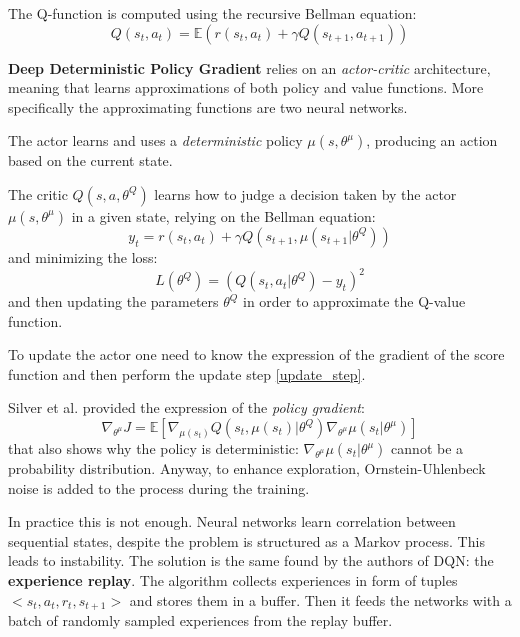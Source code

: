 \documentclass[10pt,a4paper]{scrartcl}
\begin{document}
The Q-function is computed using the recursive Bellman equation:
\begin{equation}
	Q(s_t,a_t) = \mathbb{E}(r(s_t, a_t) + \gamma Q(s_{t+1}, a_{t+1}))
\end{equation}

\textbf{Deep Deterministic Policy Gradient} relies on an \textit{actor-critic} architecture, meaning that learns approximations of both policy and value functions. More specifically the approximating functions are two neural networks.

The actor learns and uses a \textit{deterministic} policy $ \mu(s,\theta^\mu) $, producing an action based on the current state.

The critic $ Q(s,a,\theta^Q) $ learns how to judge a decision taken by the actor $ \mu(s, \theta^\mu) $ in a given state, relying on the Bellman equation:
\begin{equation}
	y_t = r(s_t, a_t) + \gamma Q (s_{t+1}, \mu(s_{t+1}| \theta^Q))
\end{equation}
and minimizing the loss:
\begin{equation}
	L(\theta^Q) = (Q(s_t,a_t|\theta^Q) - y_t)^2
\end{equation}
and then updating the parameters $ \theta^Q $ in order to approximate the Q-value function.

To update the actor one need to know the expression of the gradient of the score function and then perform the update step \eqref{update_step}.

Silver et al. \cite{silver2014deterministic} provided the expression of the \textit{policy gradient}:
\begin{equation}
	\nabla_{\theta^\mu} J = \mathbb{E}[\nabla_{\mu(s_t)}Q(s_t,\mu(s_t)|\theta^Q) \nabla_{\theta^\mu}\mu(s_t|\theta^\mu)]
\end{equation}
that also shows why the policy is deterministic: $ \nabla_{\theta^\mu}\mu(s_t|\theta^\mu) $ cannot be a probability distribution. Anyway, to enhance exploration, Ornstein-Uhlenbeck noise is added to the process during the training.

In practice this is not enough. Neural networks learn correlation between sequential states, despite the problem is structured as a Markov process. This leads to instability. The solution is the same found by the authors of DQN: the \textbf{experience replay}. The algorithm collects experiences in form of tuples $ <s_t, a_t, r_t, s_{t+1}> $ and stores them in a buffer. Then it feeds the networks with a batch of randomly sampled experiences from the replay buffer.
\end{document}
